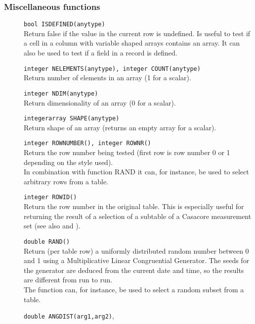 \subsubsection{Miscellaneous functions}
\begin{description}
  \item[] \texttt{bool ISDEFINED(anytype)}\\
    Return false if the value in the current row is undefined. Is
    useful to test if a cell in a column with variable shaped arrays
    contains an array. It can also be used to test if a field in a
    record is defined.
  \item[] \texttt{integer NELEMENTS(anytype), integer COUNT(anytype)}\\
    Return number of elements in an array (1 for a scalar).
  \item[] \texttt{integer NDIM(anytype)}\\
    Return dimensionality of an array (0 for a scalar).
  \item[] \texttt{integerarray SHAPE(anytype)}\\
    Return shape of an array (returns an empty array for a scalar).
  \item[] \texttt{integer ROWNUMBER(), integer ROWNR()}\\
    Return the row number being tested (first row is row number 0 or 1
    depending on the style used).
    \\In combination with function RAND it can, for instance,
    be used to select arbitrary rows from a table.
  \item[] \texttt{integer ROWID()}\\
    Return the row number in the original table. This is especially
    useful for returning the result of a selection of a subtable
    of a Casacore measurement set
    (see also 
    and ).
  \item[] \texttt{double RAND()}\\
    Return (per table row) a uniformly distributed random number
    between 0 and 1 using a Multiplicative Linear Congruential Generator.
    The seeds for the generator are deduced from the current date and
    time, so the results are different from run to run.
    \\The function can, for instance, be used to select a random
    subset from a table.
  \item[] \texttt{double ANGDIST(arg1,arg2)},

\end{description}
